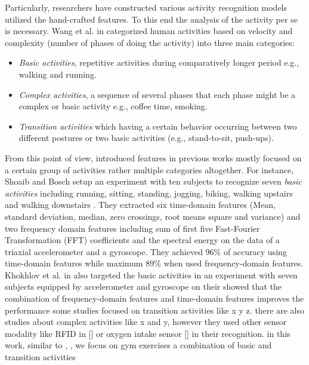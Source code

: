 \documentclass[journal,article,submit,moreauthors,pdftex]{Definitions/mdpi}
\begin{document}
Particularly, researchers have constructed various activity recognition models utilized the hand-crafted features. To this end the analysis of the activity per se is necessary. Wang et al. in \cite{wang2019survey} categorized human activities based on velocity and complexity (number of phases of doing the activity) into three main categories:
\begin{itemize}
	\item \textit{Basic activities}, repetitive activities during comparatively longer period e.g., walking and running. 
	\item \textit{Complex activities}, a sequence of several phases that each phase might be a complex or basic activity e.g., coffee time, smoking. 
	\item \textit{Transition activities} which having a certain behavior occurring between two different postures or two basic activities (e.g., stand-to-sit, push-ups).
\end{itemize}

From this point of view, introduced features in previous works mostly focused on a certain group of activities rather multiple categories altogether. For instance, Shoaib and Bosch setup an experiment with ten subjects to recognize seven \textit{basic activities} including running, sitting, standing, jogging, biking, walking upstairs and walking downstairs \cite{s140610146}. They extracted six time-domain features (Mean, standard deviation, median, zero crossings, root means square and variance) and two frequency domain features including sum of first five Fast-Fourier Transformation (FFT) coefficients and the spectral energy on the data of a triaxial accelerometer and a gyroscope. They achieved 96\% of accuracy using time-domain features while maximum 89\% when used frequency-domain features. Khokhlov et al. in \cite{khokhlov2018design} also targeted the basic activities in an experiment with seven subjects equipped by accelerometer and gyroscope on their showed that the combination of frequency-domain features and time-domain features improves the performance 
some studies focused on transition activities like x y z. there are also studies about complex activities like x and y, however they used other sensor modality like RFID in [] or oxygen intake sensor [] in their recognition. in this work, similar to \cite{morris2014recofit, }, , we focus on gym exercises a combination of basic and transition activities 
\end{document}
